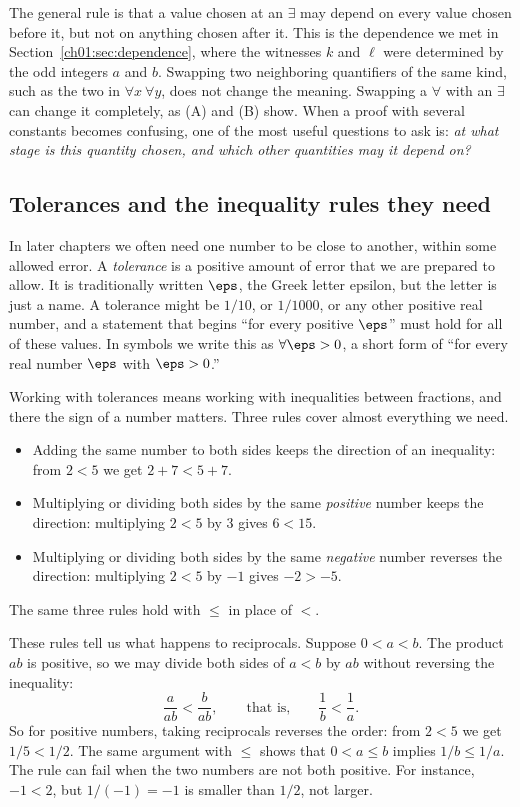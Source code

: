 The general rule is that a value chosen at an $\exists$ may depend on every value chosen before it, but not on anything chosen after it. This is the dependence we met in Section~\ref{ch01:sec:dependence}, where the witnesses $k$ and $\ell$ were determined by the odd integers $a$ and $b$. Swapping two neighboring quantifiers of the same kind, such as the two in $\forall x\ \forall y$, does not change the meaning. Swapping a $\forall$ with an $\exists$ can change it completely, as (A) and (B) show. When a proof with several constants becomes confusing, one of the most useful questions to ask is: \emph{at what stage is this quantity chosen, and which other quantities may it depend on?}

\subsection*{Tolerances and the inequality rules they need}
In later chapters we often need one number to be close to another, within some allowed error. A \emph{tolerance} is a positive amount of error that we are prepared to allow. It is traditionally written $\eps$, the Greek letter epsilon, but the letter is just a name. A tolerance might be $1/10$, or $1/1000$, or any other positive real number, and a statement that begins ``for every positive $\eps$'' must hold for all of these values. In symbols we write this as $\forall\eps>0$, a short form of ``for every real number $\eps$ with $\eps>0$.''

Working with tolerances means working with inequalities between fractions, and there the sign of a number matters. Three rules cover almost everything we need.
\begin{itemize}
\item Adding the same number to both sides keeps the direction of an inequality: from $2<5$ we get $2+7<5+7$.
\item Multiplying or dividing both sides by the same \emph{positive} number keeps the direction: multiplying $2<5$ by $3$ gives $6<15$.
\item Multiplying or dividing both sides by the same \emph{negative} number reverses the direction: multiplying $2<5$ by $-1$ gives $-2>-5$.
\end{itemize}
The same three rules hold with $\le$ in place of $<$.

These rules tell us what happens to reciprocals. Suppose $0<a<b$. The product $ab$ is positive, so we may divide both sides of $a<b$ by $ab$ without reversing the inequality:
\[
\frac{a}{ab}<\frac{b}{ab},\qquad\text{that is,}\qquad \frac1b<\frac1a.
\]
So for positive numbers, taking reciprocals reverses the order: from $2<5$ we get $1/5<1/2$. The same argument with $\le$ shows that $0<a\le b$ implies $1/b\le1/a$. The rule can fail when the two numbers are not both positive. For instance, $-1<2$, but $1/(-1)=-1$ is smaller than $1/2$, not larger.

